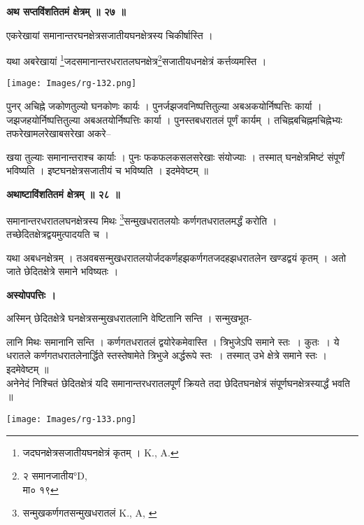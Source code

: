 \documentclass[11pt, openany]{book}
\begin{document}
\begin{center}
\textbf{\large अथ सप्तविंशतितमं क्षेत्रम् ॥ २७ ॥}
\end{center}
\vspace{5mm}

{\ab एकरेखायां समानान्तरघनक्षेत्रसजातीयघनक्षेत्रस्य चिकीर्षास्ति ।}\\
\vspace{3mm}

 यथा अबरेखायां \renewcommand{\thefootnote}{१}\footnote{जदघनक्षेत्रसजातीयघनक्षेत्रं कृतम् । {\en K., A.}}जदसमानान्तरधरातलघनक्षेत्र\renewcommand{\thefootnote}{२}\footnote{२ समानजातीय°{\en D,}\\
   मा० १९}सजातीयधनक्षेत्रं कर्त्तव्यमस्ति । 
\begin{center}
 \texttt{[image: Images/rg-132.png]}   
\end{center}
पुनर् अचिह्ने जकोणतुल्यो घनकोणः कार्यः । पुनर्जझजवनिष्पत्तितुल्या अबअकयोर्निष्पत्तिः कार्या । जझजहयोर्निष्पत्तितुल्या अबअतयोर्निष्पत्तिः कार्या । पुनस्तबधरातलं पूर्णं कार्यम् । तचिह्नबचिह्नमचिह्नेभ्यः तफरेखामलरेखाबसरेखा अकरे--

\newpage
\noindent खया तुल्याः समानान्तराश्च कार्याः । पुनः फकफलकसलसरेखाः
संयोज्याः । तस्मात् घनक्षेत्रमिष्टं संपूर्णं भविष्यति । इष्टघनक्षेत्रसजातीयं च भविष्यति । इदमेवेष्टम् ॥ \\
\begin{center}
\textbf{\large अथाष्टाविंशतितमं क्षेत्रम् ॥ २८ ॥}
\end{center}
\vspace{5mm}

{\ab समानान्तरधरातलघनक्षेत्रस्य मिथः \renewcommand{\thefootnote}{१}\footnote{सन्मुखकर्णगतसन्मुखधरातलं {\en K., A, }}सन्मुखधरातलयोः कर्णगतधरातलमर्द्धं करोति । तच्छेदितक्षेत्रद्वयमुत्पादयति च ।}\\
\vspace{3mm}

 यथा अबधनक्षेत्रम् । तअवबसन्मुखधरातलयोर्जदकर्णहझकर्णगतजदहझधरातलेन खण्डद्वयं कृतम् । अतो जाते छेदितक्षेत्रे समाने भविष्यतः ।\\
 \begin{center}
\textbf{अस्योपपत्तिः ।}
\end{center}
\vspace{2mm}

अस्मिन् छेदितक्षेत्रे घनक्षेत्रसन्मुखधरातलानि वेष्टितानि सन्ति । सन्मुखभूत-
\vspace{-2mm}

\begin{vwcol}[widths={0.65,0.35}, sep=.8cm, rule=0pt]
लानि मिथः समानानि सन्ति । कर्णगतधरातलं द्वयोरेकमेवास्ति । त्रिभुजेऽपि
समाने स्तः~। कुतः~। ये धरातले कर्णगतधरातलेनार्द्धिते स्तस्तेषामेते त्रिभुजे अर्द्धरूपे स्तः~। तस्मात् उभे क्षेत्रे समाने स्तः । इदमेवेष्टम् ॥\\
अनेनेदं निश्चितं छेदितक्षेत्रं यदि समानान्तरधरातलपूर्णं क्रियते तदा छेदितघनक्षेत्रं संपूर्णघनक्षेत्रस्यार्द्धं भवति ॥\\
\vspace{5mm}

\noindent \texttt{[image: Images/rg-133.png]}   
\end{vwcol}
\vspace{-2mm}
\end{document}

